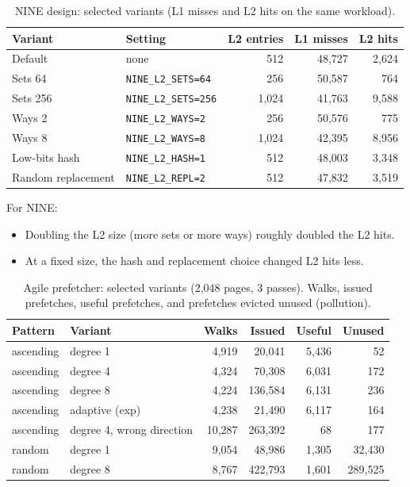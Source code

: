 \begin{table}[H]
\centering
\small
\caption{NINE design: selected variants (L1 misses and L2 hits on the same workload).}
\label{tab:sweep_nine}
\begin{tabular}{l l r r r}
\toprule
\textbf{Variant} & \textbf{Setting} & \textbf{L2 entries} & \textbf{L1 misses} & \textbf{L2 hits} \\
\midrule
Default & none & 512 & 48,727 & 2,624 \\
Sets 64 & \texttt{NINE\_L2\_SETS=64} & 256 & 50,587 & 764 \\
Sets 256 & \texttt{NINE\_L2\_SETS=256} & 1,024 & 41,763 & 9,588 \\
Ways 2 & \texttt{NINE\_L2\_WAYS=2} & 256 & 50,576 & 775 \\
Ways 8 & \texttt{NINE\_L2\_WAYS=8} & 1,024 & 42,395 & 8,956 \\
Low-bits hash & \texttt{NINE\_L2\_HASH=1} & 512 & 48,003 & 3,348 \\
Random replacement & \texttt{NINE\_L2\_REPL=2} & 512 & 47,832 & 3,519 \\
\bottomrule
\end{tabular}
\end{table}

\noindent For NINE:
\begin{itemize}
    \item Doubling the L2 size (more sets or more ways) roughly doubled the L2 hits.
    \item At a fixed size, the hash and replacement choice changed L2 hits less.
\end{itemize}

\begin{table}[H]
\centering
\small
\caption{Agile prefetcher: selected variants (2,048 pages, 3 passes). Walks, issued prefetches, useful prefetches, and prefetches evicted unused (pollution).}
\label{tab:sweep_agile}
\begin{tabular}{l l r r r r}
\toprule
\textbf{Pattern} & \textbf{Variant} & \textbf{Walks} & \textbf{Issued} & \textbf{Useful} & \textbf{Unused} \\
\midrule
ascending & degree 1 & 4,919 & 20,041 & 5,436 & 52 \\
ascending & degree 4 & 4,324 & 70,308 & 6,031 & 172 \\
ascending & degree 8 & 4,224 & 136,584 & 6,131 & 236 \\
ascending & adaptive (exp) & 4,238 & 21,490 & 6,117 & 164 \\
ascending & degree 4, wrong direction & 10,287 & 263,392 & 68 & 177 \\
random & degree 1 & 9,054 & 48,986 & 1,305 & 32,430 \\
random & degree 8 & 8,767 & 422,793 & 1,601 & 289,525 \\
\bottomrule
\end{tabular}
\end{table}

